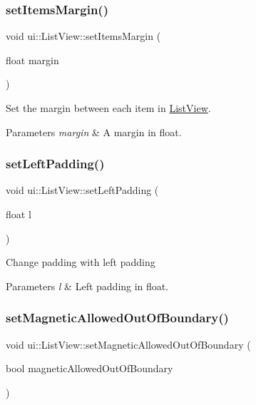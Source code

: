 \subsubsection{\texorpdfstring{set\+Items\+Margin()}{setItemsMargin()}\hspace{0.1cm}{\footnotesize\ttfamily [2/2]}}
{\footnotesize\ttfamily void ui\+::\+List\+View\+::set\+Items\+Margin (\begin{DoxyParamCaption}\item[{float}]{margin }\end{DoxyParamCaption})}

Set the margin between each item in \hyperlink{classui_1_1ListView}{List\+View}.


\begin{DoxyParams}{Parameters}
{\em margin} & A margin in float. \\
\hline
\end{DoxyParams}
\mbox{\label{classui_1_1ListView_a3ea5e926f73d1ed517d3e49c8acc53f2}} 
\subsubsection{\texorpdfstring{set\+Left\+Padding()}{setLeftPadding()}}
{\footnotesize\ttfamily void ui\+::\+List\+View\+::set\+Left\+Padding (\begin{DoxyParamCaption}\item[{float}]{l }\end{DoxyParamCaption})}

Change padding with left padding 
\begin{DoxyParams}{Parameters}
{\em l} & Left padding in float. \\
\hline
\end{DoxyParams}
\mbox{\label{classui_1_1ListView_a0869253d15f9257c5313c5b156bc5ba5}} 
\subsubsection{\texorpdfstring{set\+Magnetic\+Allowed\+Out\+Of\+Boundary()}{setMagneticAllowedOutOfBoundary()}\hspace{0.1cm}{\footnotesize\ttfamily [1/2]}}
{\footnotesize\ttfamily void ui\+::\+List\+View\+::set\+Magnetic\+Allowed\+Out\+Of\+Boundary (\begin{DoxyParamCaption}\item[{bool}]{magnetic\+Allowed\+Out\+Of\+Boundary }\end{DoxyParamCaption})}

